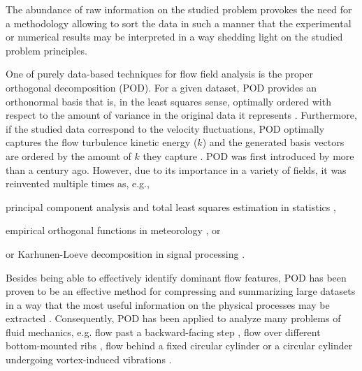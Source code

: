 
 The abundance of raw information on the studied problem provokes the need for a methodology allowing to sort the data in {such} a manner {that} the experimental or numerical results may be interpreted in a way shedding light on the studied problem principles.

One of  purely data-based techniques for flow field analysis is the proper orthogonal decomposition (POD). For a given dataset, POD provides an orthonormal basis that is, in the least squares sense, optimally ordered with respect to the amount of variance in the original data it represents \citep{isoz2019}. Furthermore, if the studied data correspond to the velocity fluctuations, POD optimally captures the flow turbulence kinetic energy ($k$) and the generated basis vectors are ordered by the amount of $k$ they capture \citep{taira2020}. POD was first introduced by \citet{Pearson1901} more than a century ago. However, due to its importance in a variety of fields, it was reinvented multiple times as, e.g., 
\begin{inparaenum}[(i)]
        \item principal component analysis \citep{hoetelling1935,jollife2014} and total least squares estimation in statistics \citep{vanHuffel2013,schaffrin2006,leyang2012},
        \item empirical orthogonal functions in meteorology \citep{lorenzxy}, or
        \item or Karhunen-Loeve decomposition in signal processing \citep{karhunen1946,loeve1946}. 
\end{inparaenum}

Besides being able to effectively identify dominant flow features, POD has been proven to be an effective method for compressing and summarizing large datasets in a way that the most useful information on the physical processes may be extracted \citep{kostas2005,feng2010}. Consequently, POD has been applied to analyze many problems of fluid mechanics, e.g. flow past a backward-facing step \citep{kostas2005,kostas2002}, flow over different bottom-mounted ribs \citep{fraga2021}, flow behind a fixed circular cylinder \citep{venturi2006,ma2000,ma2003,feng2010} or a circular cylinder undergoing vortex-induced vibrations \citep{riches2018}.

